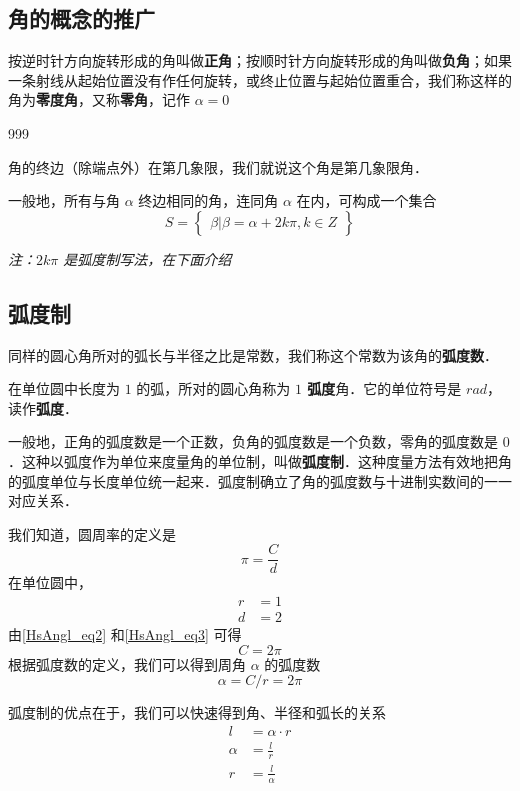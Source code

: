 
\subsection{角的概念的推广}
按逆时针方向旋转形成的角叫做\textbf{正角}；按顺时针方向旋转形成的角叫做\textbf{负角}；如果一条射线从起始位置没有作任何旋转，或终止位置与起始位置重合，我们称这样的角为\textbf{零度角}，又称\textbf{零角}，记作 $\alpha = 0$

\begin{definition}{999}

\end{definition}

角的终边（除端点外）在第几象限，我们就说这个角是第几象限角．

一般地，所有与角 $\alpha$ 终边相同的角，连同角 $\alpha$ 在内，可构成一个集合
\begin{equation}
S = \begin{Bmatrix} \beta|\beta=\alpha+2k\pi,k \in Z \end{Bmatrix}
\end{equation}

\textsl{注：$2k\pi$ 是弧度制写法，在下面介绍}

\subsection{弧度制}
同样的圆心角所对的弧长与半径之比是常数，我们称这个常数为该角的\textbf{弧度数}．

在单位圆中长度为 $1$ 的弧，所对的圆心角称为 \textbf{$1$ 弧度}角．它的单位符号是 $rad$，读作\textbf{弧度}．

一般地，正角的弧度数是一个正数，负角的弧度数是一个负数，零角的弧度数是 $0$．这种以弧度作为单位来度量角的单位制，叫做\textbf{弧度制}．这种度量方法有效地把角的弧度单位与长度单位统一起来．弧度制确立了角的弧度数与十进制实数间的一一对应关系．

我们知道，圆周率的定义是
\begin{equation}\label{HsAngl_eq2}
\pi = \frac{C}{d}
\end{equation}
在单位圆中，
\begin{equation}\label{HsAngl_eq3}
\begin{aligned}
r &= 1\\
d &= 2
\end{aligned}
\end{equation}
由\autoref{HsAngl_eq2} 和\autoref{HsAngl_eq3} 可得
\begin{equation}
C = 2\pi
\end{equation}
根据弧度数的定义，我们可以得到周角 $\alpha$ 的弧度数
\begin{equation}
\alpha = C / r = 2\pi
\end{equation}

弧度制的优点在于，我们可以快速得到角、半径和弧长的关系
\begin{equation}
\begin{aligned}
l &= \alpha \cdot r \\
\alpha &= \frac{l}{r} \\
r &= \frac{l}{\alpha}
\end{aligned}
\end{equation}
